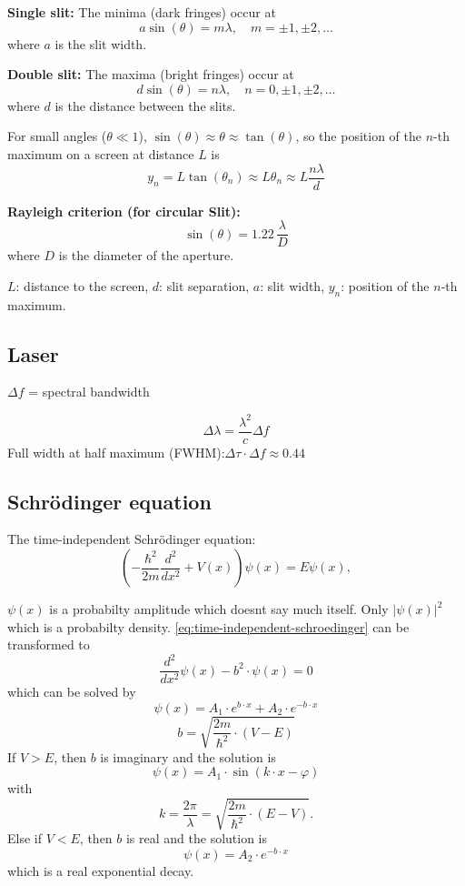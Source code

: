 \textbf{Single slit:} The minima (dark fringes) occur at
\[
a \sin(\theta) = m \lambda, \quad m = \pm 1, \pm 2, \ldots
\]
where \(a\) is the slit width.

\textbf{Double slit:} The maxima (bright fringes) occur at
\[
d \sin(\theta) = n \lambda, \quad n = 0, \pm 1, \pm 2, \ldots
\]
where \(d\) is the distance between the slits.

For small angles (\(\theta \ll 1\)), \(\sin(\theta) \approx \theta \approx \tan(\theta)\), so the position of the \(n\)-th maximum on a screen at distance \(L\) is
\[
y_n = L \tan(\theta_n) \approx L \theta_n \approx L \frac{n \lambda}{d}
\]

\textbf{Rayleigh criterion (for circular Slit):}
\[
\sin(\theta) = 1.22\, \frac{\lambda}{D}
\]
where \(D\) is the diameter of the aperture.

\(L\): distance to the screen, \(d\): slit separation, \(a\): slit width, \(y_n\): position of the \(n\)-th maximum.
\subsection{Laser}
\(\Delta f\) = spectral bandwidth

\[
\Delta \lambda = \frac{\lambda^2}{c} \Delta f
\]
Full width at half maximum (FWHM):\(\Delta \tau \cdot \Delta f \approx 0.44\)
\subsection{Schrödinger equation}
The time-independent Schrödinger equation:
\begin{equation*}
    \label{eq:time-independent-schroedinger}
\left(-\frac{\hbar^2}{2m} \frac{d^2}{dx^2} + V(x)\right) \psi(x) = E \psi(x),
\end{equation*}

\(\psi(x)\) is a probabilty amplitude which doesnt say much itself. Only \(|\psi(x)|^2\) which is a probabilty density.
\cref{eq:time-independent-schroedinger} can be transformed to 
\begin{equation*}
    \frac{d^2}{dx^2} \psi(x) - b^2 \cdot \psi(x) = 0
\end{equation*}
which can be solved by
\begin{equation*}
    \psi(x) = A_1 \cdot e^{b \cdot x} + A_2 \cdot e^{-b \cdot x}
\end{equation*}
\begin{equation*}
    b = \sqrt{\frac{2m}{\hbar^2}\cdot (V-E)}
\end{equation*}
If \(V > E\), then \(b\) is imaginary and the solution is
\begin{equation*}
    \psi(x) = A_1 \cdot \sin(k \cdot x - \varphi)
\end{equation*}
with
\begin{equation*}
    k =\frac{2\pi}{\lambda} =  \sqrt{\frac{2m}{\hbar^2}\cdot (E-V)}.
\end{equation*}
Else if \(V < E\), then \(b\) is real and the solution is
\begin{equation*}
    \psi(x) = A_2 \cdot e^{-b \cdot x}
\end{equation*}
which is a real exponential decay.

